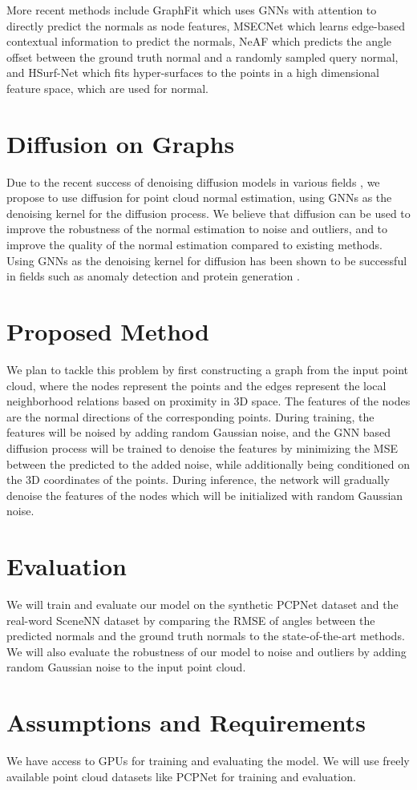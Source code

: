 \documentclass{article}
\begin{document}
More recent methods include GraphFit \cite{li2022graphfit} which uses GNNs with attention to directly predict the normals as node features, MSECNet \cite{xiu2023msecnet} which learns edge-based contextual information to predict the normals, NeAF \cite{li2023neaf} which predicts the angle offset between the ground truth normal and a randomly sampled query normal, and HSurf-Net \cite{li2022hsurf} which fits hyper-surfaces to the points in a high dimensional feature space, which are used for normal.


\section{Diffusion on Graphs}
Due to the recent success of denoising diffusion models \cite{ho2020denoising} in various fields \cite{cao2024survey,yang2023diffusion}, we propose to use diffusion for point cloud normal estimation, using GNNs as the denoising kernel for the diffusion process. We believe that diffusion can be used to improve the robustness of the normal estimation to noise and outliers, and to improve the quality of the normal estimation compared to existing methods. Using GNNs as the denoising kernel for diffusion has been shown to be successful in fields such as anomaly detection \cite{ConGNN_2024} and protein generation \cite{ingraham2023illuminating}.

\section{Proposed Method}
We plan to tackle this problem by first constructing a graph from the input point cloud, where the nodes represent the points and the edges represent the local neighborhood relations based on proximity in 3D space.
The features of the nodes are the normal directions of the corresponding points. During training, the features will be noised by adding random Gaussian noise, and the GNN based diffusion process will be trained to denoise the features by minimizing the MSE between the predicted to the added noise, while additionally being conditioned on the 3D coordinates of the points. During inference, the network will gradually denoise the features of the nodes which will be initialized with random Gaussian noise.

\section{Evaluation}
We will train and evaluate our model on the synthetic PCPNet dataset \cite{guerrero2018pcpnet} and the real-word SceneNN dataset \cite{scenenn-3dv16} by comparing the RMSE of angles between the predicted normals and the ground truth normals to the state-of-the-art methods. We will also evaluate the robustness of our model to noise and outliers by adding random Gaussian noise to the input point cloud.

\section{Assumptions and Requirements}
We have access to GPUs for training and evaluating the model. We will use freely available point cloud datasets like PCPNet for training and evaluation.

\printbibliography
\end{document}
